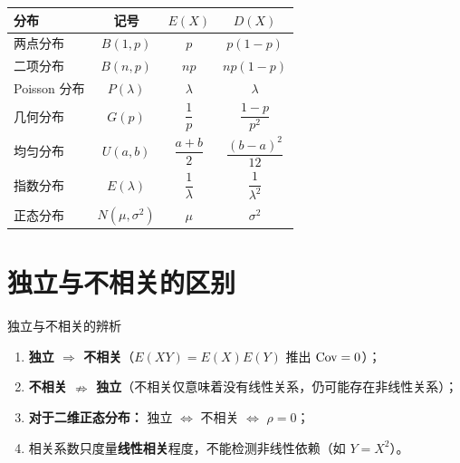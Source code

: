 \begin{center}
\begin{tabular}{lccc}
\toprule
\textbf{分布} & \textbf{记号} & \textbf{$E(X)$} & \textbf{$D(X)$} \\
\midrule
两点分布 & $B(1, p)$          & $p$                    & $p(1-p)$ \\
二项分布 & $B(n, p)$          & $np$                   & $np(1-p)$ \\
Poisson 分布 & $P(\lambda)$   & $\lambda$              & $\lambda$ \\
几何分布 & $G(p)$             & $\dfrac{1}{p}$         & $\dfrac{1-p}{p^2}$ \\
均匀分布 & $U(a, b)$          & $\dfrac{a+b}{2}$       & $\dfrac{(b-a)^2}{12}$ \\
指数分布 & $E(\lambda)$       & $\dfrac{1}{\lambda}$   & $\dfrac{1}{\lambda^2}$ \\
正态分布 & $N(\mu, \sigma^2)$ & $\mu$                  & $\sigma^2$ \\
\bottomrule
\end{tabular}
\end{center}

\section{独立与不相关的区别}

\begin{myTheorem}{独立与不相关的辨析}
\begin{enumerate}
	\item \textbf{独立 $\Rightarrow$ 不相关}（$E(XY) = E(X)E(Y)$ 推出 $\mathrm{Cov} = 0$）；
	\item \textbf{不相关 $\nRightarrow$ 独立}（不相关仅意味着没有线性关系，仍可能存在非线性关系）；
	\item \textbf{对于二维正态分布：} 独立 $\iff$ 不相关 $\iff$ $\rho = 0$；
	\item 相关系数只度量\textbf{线性相关}程度，不能检测非线性依赖（如 $Y = X^2$）。
\end{enumerate}
\end{myTheorem}


